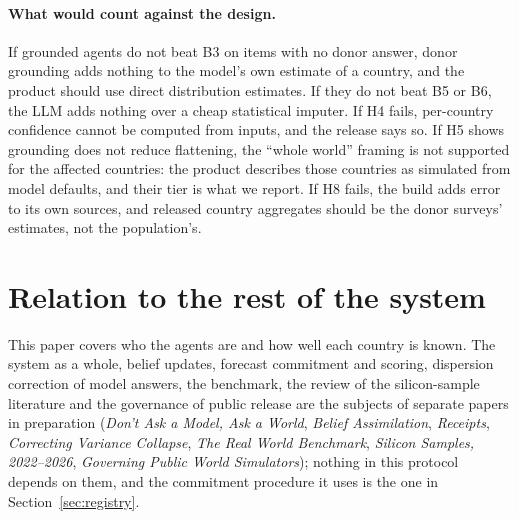 \documentclass[10pt]{article}
\newcommand{\companion}[1]{\emph{#1}}
\begin{document}
\paragraph{What would count against the design.} If grounded agents do not beat B3 on items with no donor answer, donor grounding adds nothing to the model's own estimate of a country, and the product should use direct distribution estimates. If they do not beat B5 or B6, the LLM adds nothing over a cheap statistical imputer. If H4 fails, per-country confidence cannot be computed from inputs, and the release says so. If H5 shows grounding does not reduce flattening, the ``whole world'' framing is not supported for the affected countries: the product describes those countries as simulated from model defaults, and their tier is what we report. If H8 fails, the build adds error to its own sources, and released country aggregates should be the donor surveys' estimates, not the population's.

\section{Relation to the rest of the system}
\label{sec:companions}

This paper covers who the agents are and how well each country is known. The system as a whole, belief updates, forecast commitment and scoring, dispersion correction of model answers, the benchmark, the review of the silicon-sample literature and the governance of public release are the subjects of separate papers in preparation (\companion{Don't Ask a Model, Ask a World}, \companion{Belief Assimilation}, \companion{Receipts}, \companion{Correcting Variance Collapse}, \companion{The Real World Benchmark}, \companion{Silicon Samples, 2022--2026}, \companion{Governing Public World Simulators}); nothing in this protocol depends on them, and the commitment procedure it uses is the one in Section~\ref{sec:registry}.
\end{document}
